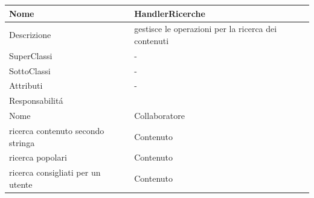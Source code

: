 \begin{center} %
    \begin{longtable}{ |p{3cm}|p{3cm}|p{3cm}|p{3cm}| }
        \hline
        Nome & \multicolumn{3}{|p{9cm}|}{HandlerRicerche} \\\hline
        Descrizione & \multicolumn{3}{|p{9cm}|}{gestisce le operazioni per la ricerca dei contenuti} \\\hline
        SuperClassi & \multicolumn{3}{|p{9cm}|}{-} \\\hline
        SottoClassi & \multicolumn{3}{|p{9cm}|}{-} \\\hline
        Attributi & \multicolumn{3}{|p{9cm}|}{-} \\\hline
        \multicolumn{4}{|p{12cm}|}{Responsabilit\'a} \\\hline %
        \multicolumn{2}{|p{6cm}|}{Nome} & \multicolumn{2}{|p{6cm}|}{Collaboratore} \\\hline %
        \multicolumn{2}{|p{6cm}|}{ricerca contenuto secondo stringa} & \multicolumn{2}{|p{6cm}|}{Contenuto} \\\hline
        \multicolumn{2}{|p{6cm}|}{ricerca popolari} & \multicolumn{2}{|p{6cm}|}{Contenuto} \\\hline
        \multicolumn{2}{|p{6cm}|}{ricerca consigliati per un utente} & \multicolumn{2}{|p{6cm}|}{Contenuto} \\\hline
        \end{longtable}
\end{center}


